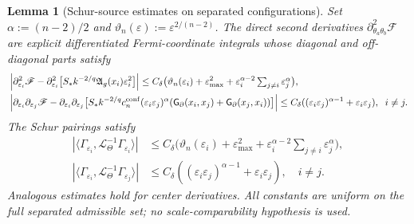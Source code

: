 \documentclass[11pt,reqno,a4paper]{amsart}
\numberwithin{equation}{section}
\theoremstyle{plain}
\newtheorem{lemma}[theorem]{Lemma}
\theoremstyle{remark}
\theoremstyle{plain}
\begin{document}
\begin{lemma}[Schur-source estimates on separated configurations]
\label{lem:schur-source-calculus}
Set $\alpha:=(n-2)/2$ and $\vartheta_n(\varepsilon):=\varepsilon^{2/(n-2)}$.
The direct second derivatives $\partial^2_{\theta_a\theta_b}\mathscr F$
are explicit differentiated Fermi-coordinate integrals whose diagonal and
off-diagonal parts satisfy
\begin{align}
\label{eq:schur-source-direct-diag}
&\left|\partial_{\varepsilon_i}^2\mathscr F
-\partial_{\varepsilon_i}^2\bigl[S_\ast k^{-2/q}\mathfrak A_g(x_i)\varepsilon_i^2\bigr]\right|
\le C_\delta\bigl(\vartheta_n(\varepsilon_i)+\varepsilon_{\max}^2
+\varepsilon_i^{\alpha-2}\textstyle\sum_{j\ne i}\varepsilon_j^\alpha\bigr),\\
\label{eq:schur-source-direct-mixed}
&\left|\partial_{\varepsilon_i}\partial_{\varepsilon_j}\mathscr F
-\partial_{\varepsilon_i}\partial_{\varepsilon_j}\bigl[
S_\ast k^{-2/q}c_n^{\mathrm{conf}}(\varepsilon_i\varepsilon_j)^\alpha
(\mathsf G_\partial(x_i,x_j)+\mathsf G_\partial(x_j,x_i))\bigr]\right|
\le C_\delta((\varepsilon_i\varepsilon_j)^{\alpha-1}+\varepsilon_i\varepsilon_j),
\hspace{2mm} i\ne j.
\end{align}
The Schur pairings satisfy
\begin{align}
\label{eq:schur-pair-diag}
|\langle\Gamma_{\varepsilon_i},\mathcal L_\Theta^{-1}\Gamma_{\varepsilon_i}\rangle|
&\le C_\delta\bigl(\vartheta_n(\varepsilon_i)+\varepsilon_{\max}^2
+\varepsilon_i^{\alpha-2}\textstyle\sum_{j\ne i}\varepsilon_j^\alpha\bigr),\\
\label{eq:schur-pair-mixed}
|\langle\Gamma_{\varepsilon_i},\mathcal L_\Theta^{-1}\Gamma_{\varepsilon_j}\rangle|
&\le C_\delta((\varepsilon_i\varepsilon_j)^{\alpha-1}+\varepsilon_i\varepsilon_j),
\quad i\ne j.
\end{align}
Analogous estimates hold for center derivatives.  All constants are uniform on
the full separated admissible set; no scale-comparability hypothesis is used.
\end{lemma}
\end{document}
